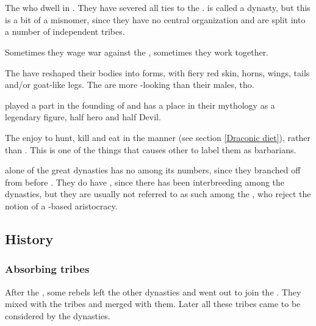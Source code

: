 \section{\Baelzerach}
The \daemonic{} \resphain{} who dwell in \Machai{}. 
They have severed all ties to the \banes. 
\Baelzerach{} is called a dynasty, but this is a bit of a misnomer, since they have no central organization and are split into a number of independent tribes. 

Sometimes they wage war against the \dragons, sometimes they work together. 

The \Baelzerach{} have reshaped their bodies into \daemonic{} forms, with fiery red skin, horns, wings, tails and/or goat-like legs. 
The \resviel{} are more \human-looking than their males, tho. 

\Ishna{} played a part in the founding of \Baelzerach{} and has a place in their mythology as a legendary figure, half hero and half Devil. 

The \Baelzerach{} enjoy to hunt, kill and eat in the \draconic{} manner (see section \ref{Draconic diet}), rather than . 
This is one of the things that causes other \resphain{} to label them as barbarians. 

\Baelzerach{} alone of the great dynasties has no \satharioth{} among its numbers, since they branched off from \KiriathSepher{} before . 
They do have \ketherain, since there has been interbreeding among the dynasties, but they are usually not referred to as such among the \Baelzerach, who reject the notion of a \KiriathSepher{}-based aristocracy. 









\subsection{History}





\subsubsection{Absorbing tribes}
After the , some \Baelzerach{} rebels left the other dynasties and went out to join the . 
They mixed with the tribes and merged with them. 
Later all these tribes came to be considered \Baelzerach{} by the dynasties. 









